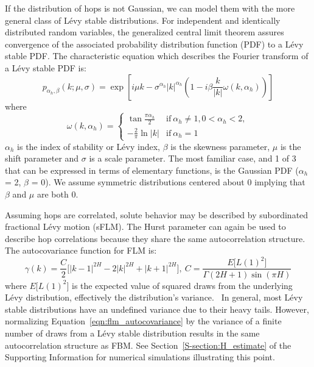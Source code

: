 \documentclass{article}
\begin{document}
  If the distribution of hops is not Gaussian, we can model them with the
  more general class of L\'evy stable distributions. For independent and identically
  distributed random variables, the generalized central limit theorem assures 
  convergence of the associated probability distribution function (PDF) to a 
  L\'evy stable PDF. \cite{klages_anomalous_2008} The characteristic equation which 
  describes the Fourier transform of a L\'evy stable PDF is:
  \begin{equation}
    p_{\alpha_h, \beta}(k;\mu,\sigma) =\exp\left[i\mu k - \sigma^{\alpha_h}|k|^{\alpha_h}\left(1 - i\beta\frac{k}{|k|}\omega(k, \alpha_h)\right)\right]
  \end{equation}
  where \\
  \[\omega(k, \alpha_h) = \begin{cases}
  	\tan{\frac{\pi \alpha_h}{2}} & \text{if}~\alpha_h \neq 1, 0 < \alpha_h < 2, \\
  	-\frac{2}{\pi}\ln |k| & \text{if}~\alpha_h = 1
  	 \end{cases}
  \]
  $\alpha_h$ is the index of stability or L\'evy index, $\beta$ is the skewness 
  parameter, $\mu$ is the shift parameter and $\sigma$ is a scale parameter. The most
  familiar case, and 1 of 3 that can be expressed in terms of elementary functions,
  is the Gaussian PDF ($\alpha_h$ = 2, $\beta$ = 0). We assume symmetric distributions
  centered about 0 implying that $\beta$ and $\mu$ are both 0.
  
  Assuming hops are correlated, solute behavior may be described by subordinated 
  fractional L\'evy motion (sFLM). The Hurst parameter can again be used to describe
  hop correlations because they share the same autocorrelation structure.~\cite{tikanmaki_fractional_2010}
  The autocovariance function for FLM is:
  \begin{equation}
    \gamma(k) = \dfrac{C}{2}\bigg[|k-1|^{2H} - 2|k|^{2H} + |k+1|^{2H}\bigg],
    ~C = \frac{E\big[L(1)^2\big]}{\Gamma(2H + 1)\sin(\pi H)}
    \label{eqn:flm_autocovariance}
  \end{equation}
  where $E\big[L(1)^2\big]$ is the expected value of squared draws from the 
  underlying L\'evy distribution, effectively the distribution's 
  variance.~\cite{bishwal_maximum_2011} In general, most L\'evy stable distributions
  have an undefined variance due to their heavy tails. However, normalizing
  Equation~\ref{eqn:flm_autocovariance} by the variance of a finite number of draws
  from a L\'evy stable distribution results in the same autocorrelation structure as FBM.
  See Section~\ref{S-section:H_estimate} of the Supporting Information for numerical
  simulations illustrating this point.  %
  
\end{document}
